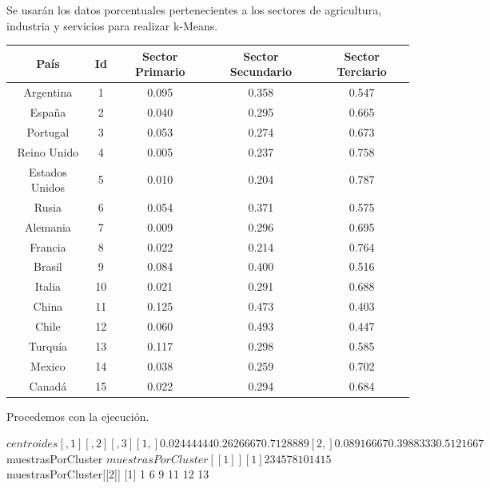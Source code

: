 \documentclass [a4paper] {article}
\begin{document}
\bigskip
Se usarán los datos porcentuales pertenecientes a los sectores de agricultura, industria y servicios para realizar
k-Means.

\begin{table}[H]
\begin{center}
\begin{tabular}{|c|c|c|c|c|}
\hline
País & Id & Sector Primario & Sector Secundario & Sector Terciario\\
\hline \hline
Argentina & 1 & 0.095 & 0.358 & 0.547\\ \hline
España & 2 & 0.040 & 0.295 & 0.665\\ \hline
Portugal & 3 & 0.053 & 0.274 & 0.673\\ \hline
Reino Unido & 4 & 0.005 & 0.237 & 0.758\\ \hline
Estados Unidos & 5 & 0.010 & 0.204 & 0.787\\ \hline
Rusia & 6 & 0.054 & 0.371 & 0.575\\ \hline
Alemania & 7 & 0.009 & 0.296 & 0.695\\ \hline
Francia & 8 & 0.022 & 0.214 & 0.764\\ \hline
Brasil & 9 & 0.084 & 0.400 & 0.516\\ \hline
Italia & 10 & 0.021 & 0.291 & 0.688\\ \hline
China & 11 & 0.125 & 0.473 & 0.403\\ \hline
Chile & 12 & 0.060 & 0.493 & 0.447\\ \hline
Turquía & 13 & 0.117 & 0.298 & 0.585\\ \hline
Mexico & 14 & 0.038 & 0.259 & 0.702\\ \hline
Canadá & 15 & 0.022 & 0.294 & 0.684\\ \hline
\end{tabular}
\end{center}
\end{table}

Procedemos con la ejecución.
\begin{Schunk}
\begin{Soutput}
$centroides
           [,1]      [,2]      [,3]
[1,] 0.02444444 0.2626667 0.7128889
[2,] 0.08916667 0.3988333 0.5121667

$muestrasPorCluster
$muestrasPorCluster[[1]]
[1]  2  3  4  5  7  8 10 14 15

$muestrasPorCluster[[2]]
[1]  1  6  9 11 12 13
\end{Soutput}
\end{Schunk}
\end{document}
